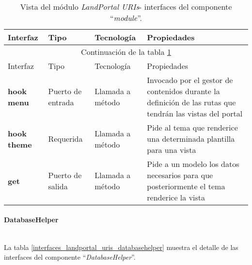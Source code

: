 \begin{longtable}[c]{|p{25mm}|p{20mm}|p{30mm}|p{60mm}|}
	\caption{Vista del módulo \textit{LandPortal URIs}- interfaces del componente ``\textit{module}''. \label{interfaces_landportal_uris_module}}\\
		\hline
			Interfaz & Tipo & Tecnología & Propiedades\\
		\hline
		\hline
	\endfirsthead
		\hline
		\multicolumn{4}{|c|}{Continuación de la tabla \ref{interfaces_landportal_uris_module}}\\
		\hline
			Interfaz & Tipo & Tecnología & Propiedades\\
		\hline
		\hline
	\endhead
	\hline
	\endfoot
		\textbf{hook menu} & Puerto de entrada & Llamada a método & Invocado por el gestor de contenidos durante la definición de las rutas que tendrán las vistas del portal \\
		\hline
		\textbf{hook theme} & Requerida & Llamada a método & Pide al tema que renderice una determinada plantilla para una vista \\
		\hline
		\textbf{get} & Puerto de salida & Llamada a método & Pide a un modelo los datos necesarios para que posteriormente el tema renderice la vista \\
		\hline
	\hline
	\hline
\end{longtable}


\paragraph{DatabaseHelper} \hfill \\
La tabla \ref{interfaces_landportal_uris_databasehelper} muestra el detalle de las interfaces del componente ``\textit{DatabaseHelper}''.  

